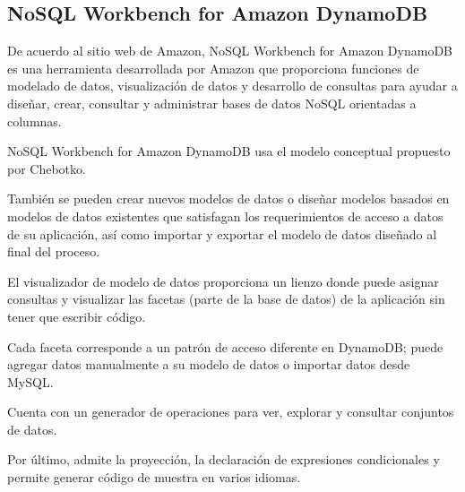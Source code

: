 \subsection{NoSQL Workbench for Amazon DynamoDB}

De acuerdo al sitio web de Amazon\cite{amazon_nosql_2020}, NoSQL Workbench for Amazon DynamoDB es una herramienta desarrollada por Amazon que proporciona funciones de modelado de datos, visualización de datos y desarrollo de consultas para ayudar a diseñar, crear, consultar y administrar bases de datos NoSQL orientadas a columnas.


NoSQL Workbench for Amazon DynamoDB usa el modelo conceptual propuesto por Chebotko\cite{chebotko_big_2015}.


También se pueden crear nuevos modelos de datos o diseñar modelos basados ​​en modelos de datos existentes que satisfagan los requerimientos de acceso a datos de su aplicación, así como importar y exportar el modelo de datos diseñado al final del proceso. 


El visualizador de modelo de datos proporciona un lienzo donde puede asignar consultas y visualizar las facetas (parte de la base de datos) de la aplicación sin tener que escribir código.


Cada faceta corresponde a un patrón de acceso diferente en DynamoDB; puede agregar datos manualmente a su modelo de datos o importar datos desde MySQL. 


Cuenta con un generador de operaciones para ver, explorar y consultar conjuntos de datos.


Por último, admite la proyección, la declaración de expresiones condicionales y permite generar código de muestra en varios idiomas.

